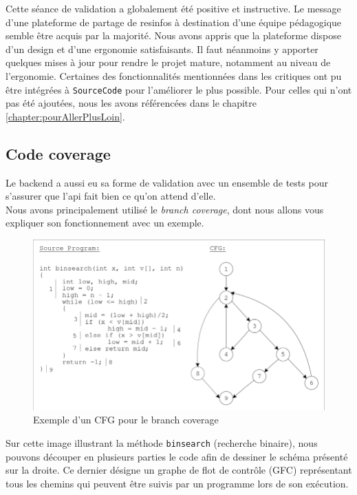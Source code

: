 Cette séance de validation a globalement été positive et instructive. Le message d'une plateforme de partage de \glspl{resinfo} à destination d'une équipe pédagogique semble être acquis par la majorité. 
Nous avons appris que la plateforme dispose d'un design et d'une ergonomie satisfaisants. Il faut néanmoins y apporter quelques mises à jour pour rendre le projet mature, notamment au niveau de l'ergonomie.
Certaines des fonctionnalités mentionnées dans les critiques ont pu être intégrées à \texttt{SourceCode} pour l'améliorer le plus possible. Pour celles qui n'ont pas été ajoutées, nous les avons référencées dans le chapitre \ref{chapter:pourAllerPlusLoin}.

\subsection{Code coverage}
\label{section:codeCoverage}

Le \gls{backend} a aussi eu sa forme de validation avec un ensemble de tests pour s'assurer que l'\gls{api} fait bien ce qu'on attend d'elle.\\

Nous avons principalement utilisé le \textit{branch coverage}, dont nous allons vous expliquer son fonctionnement avec un exemple.\\

\begin{figure}[H]
    \includegraphics[width=\textwidth,height=0.3\textheight,keepaspectratio]{images/analyseCritique/CFG.png}
    \centering
    \caption{Exemple d'un CFG pour le branch coverage}
\end{figure}

Sur cette image illustrant la méthode \texttt{binsearch} (recherche binaire), nous pouvons découper en plusieurs parties le code afin de dessiner le schéma présenté sur la droite. Ce dernier désigne un graphe de flot de contrôle (GFC) représentant tous les chemins qui peuvent être suivis par un programme lors de son exécution.\\

